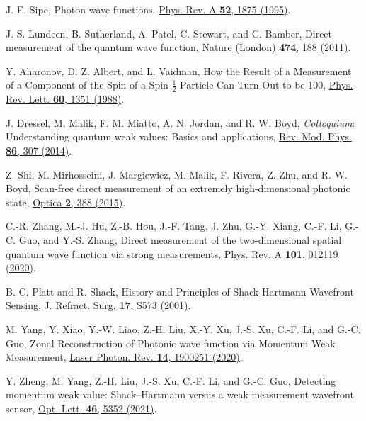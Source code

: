 \documentclass[pra,english,reprint,nofootinbib,aps,superscriptaddress,showpacs,showkeys]{revtex4-2}
\theoremstyle{definition}
\theoremstyle{remark}
\begin{document}
	\begin{thebibliography}{99}
		
		J. E. Sipe,
		Photon wave functions.
		\href{https://doi.org/10.1103/PhysRevA.52.1875}{Phys. Rev. A \textbf{52}, 1875 (1995)}.
		
		J. S. Lundeen, B. Sutherland, A. Patel, C. Stewart, and C. Bamber,
		Direct measurement of the quantum wave function,
		\href{https://doi.org/10.1038/nature10120}{Nature (London) \textbf{474}, 188 (2011)}.
		
		Y. Aharonov, D. Z. Albert, and L. Vaidman,
		How the Result of a Measurement of a Component of the Spin of a Spin-$\frac{1}{2}$ Particle Can Turn Out to be 100,
		\href{https://doi.org/10.1103/PhysRevLett.60.1351}{Phys. Rev. Lett. \textbf{60}, 1351 (1988)}.
		
		J. Dressel, M. Malik, F. M. Miatto, A. N. Jordan, and R. W. Boyd,
		\emph{Colloquium}: Understanding quantum weak values: Basics and applications,
		\href{https://doi.org/10.1103/RevModPhys.86.307}{Rev. Mod. Phys. \textbf{86}, 307 (2014)}.
		
		Z. Shi, M. Mirhosseini, J. Margiewicz, M. Malik, F. Rivera, Z. Zhu, and R. W. Boyd,
		Scan-free direct measurement of an extremely high-dimensional photonic state,
		\href{https://doi.org/10.1364/OPTICA.2.000388}{Optica \textbf{2}, 388 (2015)}.
		
		C.-R. Zhang, M.-J. Hu, Z.-B. Hou, J.-F. Tang, J. Zhu, G.-Y. Xiang, C.-F. Li, G.-C. Guo, and Y.-S. Zhang,
		Direct measurement of the two-dimensional spatial quantum wave function via strong measurements,
		\href{https://doi.org/10.1103/PhysRevA.101.012119}{Phys. Rev. A \textbf{101}, 012119 (2020)}.
		
		B. C. Platt and R. Shack,
		History and Principles of Shack-Hartmann Wavefront Sensing,
		\href{https://doi.org/10.3928/1081-597X-20010901-13}{J. Refract. Surg. \textbf{17}, S573 (2001)}.
		
		M. Yang, Y. Xiao, Y.-W. Liao, Z.-H. Liu, X.-Y. Xu, J.-S. Xu, C.-F. Li, and G.-C. Guo,
		Zonal Reconstruction of Photonic wave function via Momentum Weak Measurement,
		\href{https://doi.org/10.1002/lpor.201900251}{Laser Photon. Rev. \textbf{14}, 1900251 (2020)}.
		
		Y. Zheng, M. Yang, Z.-H. Liu, J.-S. Xu, C.-F. Li, and G.-C. Guo,
		Detecting momentum weak value: Shack--Hartmann versus a weak measurement wavefront sensor,
		\href{https://doi.org/10.1364/OL.439174}{Opt. Lett. \textbf{46}, 5352 (2021)}.
		

\end{thebibliography}
\end{document}
